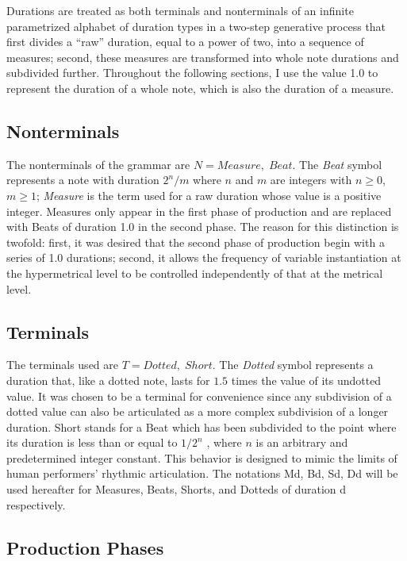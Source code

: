 \documentclass{article}
\begin{document}
Durations are treated as both terminals and nonterminals of an infinite parametrized alphabet of duration types in a two-step generative process that first divides a “raw” duration, equal to a power of two, into a sequence of measures; second, these measures are transformed into whole note durations and subdivided further. Throughout the following sections, I use the value 1.0 to represent the duration of a whole note, which is also the duration of a measure.

\subsection{Nonterminals}

The nonterminals of the grammar are $N={Measure, \; Beat}$. 
The \emph{Beat} symbol represents a note with duration $2^n/m$ where $n$ and $m$ are integers with $n \geq 0$, $m \geq 1$; \emph{Measure} is the term used for a raw duration whose value is a positive integer. Measures only appear in the first phase of production and are replaced with Beats of duration 1.0 in the second phase. The reason for this distinction is twofold: first, it was desired that the second phase of production begin with a series of 1.0 durations; second, it allows the frequency of variable instantiation at the hypermetrical level to be controlled independently of that at the metrical level.


\subsection{Terminals}

The terminals used are $T={Dotted, \; Short}$.
The \emph{Dotted} symbol represents a duration that, like a dotted note, lasts for $1.5$ times the value of its undotted value. It was chosen to be a terminal for convenience since any subdivision of a dotted value can also be articulated as a more complex subdivision of a longer duration. Short stands for a Beat which has been subdivided to the point where its duration is less than or equal to $1/2^n$ , where $n$ is an arbitrary and predetermined integer constant. This behavior is designed to mimic the limits of human performers’ rhythmic articulation. The notations Md, Bd, Sd, Dd will be used hereafter for Measures, Beats, Shorts, and Dotteds of duration d respectively.

\subsection{Production Phases}
\end{document}
